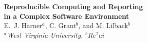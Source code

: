 
\setlength{\textwidth}{160mm}\setlength{\textheight}{240mm}
\setlength{\oddsidemargin}{0mm}\setlength{\evensidemargin}{0mm}
\setlength{\topmargin}{-10mm}
\setlength{\parindent}{0mm} 
\pagestyle{empty}	%



\begin{center}
{\Large\bf Reproducible Computing and Reporting\\ in a Complex Software Environment}\\[4mm]

E.~J. Harner$^a$, C. Grant$^b$, and  M. Lilback$^b$\\ 				

{\small \em $^a$West Virginia University, $^b$Rc$^2$ai}\\[0mm]
\end{center}

